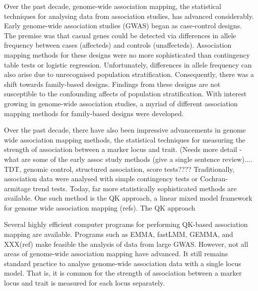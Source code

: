 \documentclass[12pt]{article}
\begin{document}
Over the past decade, genome-wide association mapping, the statistical techniques for analysing data from association studies, has advanced considerably. Early genome-wide association studies (GWAS) began as case-control designs. The premise was that casual genes could be detected via differences in allele frequency between cases (affecteds) and controls (unaffecteds). Association mapping methods for these designs were no more sophisticated than contingency table tests or logistic regression. Unfortunately, differences 
in allele frequency can also arise due to unrecognised population stratification. Consequently, there was a shift towards family-based 
designs. Findings from these designs are
not susceptible to the confounding affects of population stratification. With interest growing in genome-wide association studies, 
a myriad of different association mapping methods for family-based designs were developed. 


Over the past decade, there have also been impressive advancements in genome wide 
association mapping methods, the statistical techniques for measuring the strength of 
association between a marker locus and trait. (Needs more detail - what are some of the early assoc study methods (give a single sentence review).... TDT, genomic control, structured association, score tests???? 
Traditionally, association data were 
analysed with simple contingency tests or Cochran-armitage  trend tests. Today, far 
more statistically sophisticated methods are available. One such method is the  QK 
approach, a linear mixed model framework for genome wide association 
mapping (refs).  The QK approach 


Several highly efficient computer programs for performing QK-based 
association mapping are available. Programs such as EMMA, fastLMM, GEMMA, and 
XXX(ref) make feasible the analysis of data from large GWAS. 
 However, not all areas of genome-wide association 
mapping have advanced. It still remains standard practice to analyse genome-wide 
association data with a single locus model. That is,  it is common for the strength of 
association between a marker locus and trait is measured for each locus separately. 
\end{document}
